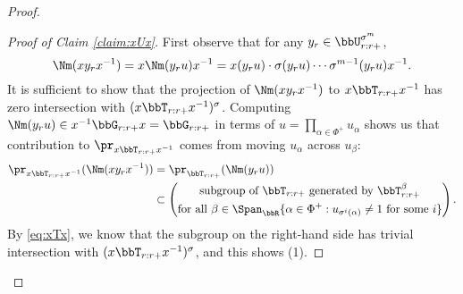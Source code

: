 \begin{proof}
  \begin{proof}[Proof of Claim \ref{claim:xUx}]
    First observe that for any $y_r \in \bbU_{r:r+}^{\sigma^m}$,
    \begin{equation*}
      \Nm(xy_r x^{-1}) = x \Nm(y_r u) x^{-1} = x (y_r u) \cdot \sigma(y_r u) \cdots \sigma^{m-1}(y_r u) x^{-1}.
    \end{equation*}
    It is sufficient to show that the projection of $\Nm(xy_rx^{-1})$ to $x\bbT_{r:r+}x^{-1}$ has zero intersection with $(x \bbT_{r:r+} x^{-1})^\sigma$. Computing $\Nm(y_r u) \in x^{-1} \bbG_{r:r+} x = \bbG_{r:r+}$ in terms of $u = \prod_{\alpha \in \Phi^+} u_\alpha$ shows us that contribution to $\pr_{x \bbT_{r:r+} x^{-1}}$ comes from moving $u_\alpha$ across $u_\beta$:
    \begin{align*}
      \pr_{x \bbT_{r:r+} x^{-1}}(\Nm(xy_rx^{-1})) 
      &= \pr_{\bbT_{r:r+}}(\Nm(y_r u)) \\
      &\subset \left(\begin{gathered}\text{subgroup of $\bbT_{r:r+}$ generated by $\bbT_{r:r+}^\beta$} \\ \text{for all $\beta \in \Span_{\bbR}\{\alpha \in \Phi^+ : \text{$u_{\sigma^i(\alpha)} \neq 1$ for some $i$}\}$}\end{gathered}\right).
    \end{align*}
    By \eqref{eq:xTx}, we know that the subgroup on the right-hand side has trivial intersection with $(x \bbT_{r:r+} x^{-1})^\sigma$, and this shows (1).


\end{proof}
\end{proof}
